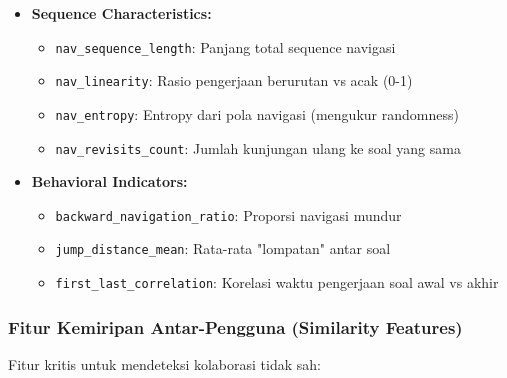 \begin{itemize}
    \item \textbf{Sequence Characteristics:}
    \begin{itemize}
        \item \texttt{nav\_sequence\_length}: Panjang total sequence navigasi
        \item \texttt{nav\_linearity}: Rasio pengerjaan berurutan vs acak (0-1)
        \item \texttt{nav\_entropy}: Entropy dari pola navigasi (mengukur randomness)
        \item \texttt{nav\_revisits\_count}: Jumlah kunjungan ulang ke soal yang sama
    \end{itemize}
    
    \item \textbf{Behavioral Indicators:}
    \begin{itemize}
        \item \texttt{backward\_navigation\_ratio}: Proporsi navigasi mundur
        \item \texttt{jump\_distance\_mean}: Rata-rata "lompatan" antar soal
        \item \texttt{first\_last\_correlation}: Korelasi waktu pengerjaan soal awal vs akhir
    \end{itemize}
\end{itemize}

\subsubsection{Fitur Kemiripan Antar-Pengguna (Similarity Features)}
\label{sec:fiturKemiripan}

Fitur kritis untuk mendeteksi kolaborasi tidak sah:


